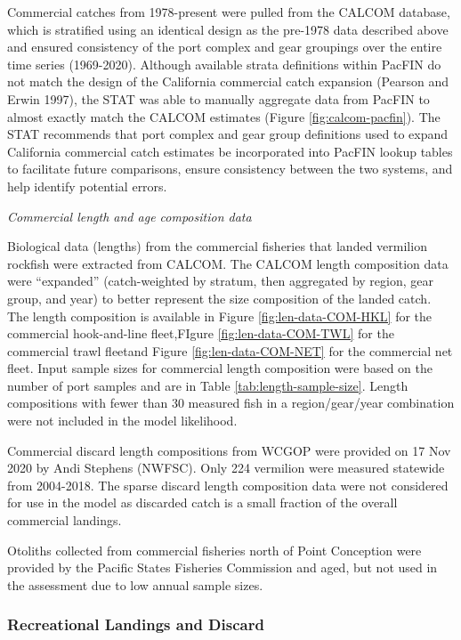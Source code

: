\documentclass[
  english,
  a4paper,
]{article}
\begin{document}
Commercial catches from 1978-present were pulled from the CALCOM database, which is stratified using an identical design as the pre-1978 data described above and ensured consistency of the port complex and gear groupings over the entire time series (1969-2020). Although available strata definitions within PacFIN do not match the design of the California commercial catch expansion (Pearson and Erwin 1997), the STAT was able to manually aggregate data from PacFIN to almost exactly match the CALCOM estimates (Figure \ref{fig:calcom-pacfin}). The STAT recommends that port complex and gear group definitions used to expand California commercial catch estimates be incorporated into PacFIN lookup tables to facilitate future comparisons, ensure consistency between the two systems, and help identify potential errors.

\emph{Commercial length and age composition data}

Biological data (lengths) from the commercial fisheries that landed vermilion rockfish were extracted
from CALCOM. The CALCOM length composition data were ``expanded'' (catch-weighted by stratum, then aggregated by region, gear group, and year) to better represent the size composition of the landed catch. The length composition is available in Figure \ref{fig:len-data-COM-HKL}
for the commercial hook-and-line fleet,FIgure \ref{fig:len-data-COM-TWL} for the commercial trawl fleetand Figure \ref{fig:len-data-COM-NET} for the commercial net fleet.
Input sample sizes for commercial length composition were based on the number of port samples and are in Table \ref{tab:length-sample-size}. Length compositions with fewer than 30 measured fish in a region/gear/year combination were not included in the model likelihood.

Commercial discard length compositions from WCGOP were provided on
17 Nov 2020 by Andi Stephens (NWFSC). Only 224 vermilion were measured statewide from
2004-2018. The sparse discard length composition data were not considered for use in the
model as discarded catch is a small fraction of the overall commercial landings.

Otoliths collected from commercial fisheries north of Point Conception were provided by
the Pacific States Fisheries Commission and aged, but not used in the assessment due
to low annual sample sizes.

\hypertarget{recreational-landings-and-discard}{%
\subsubsection{Recreational Landings and Discard}\label{recreational-landings-and-discard}}
\end{document}
